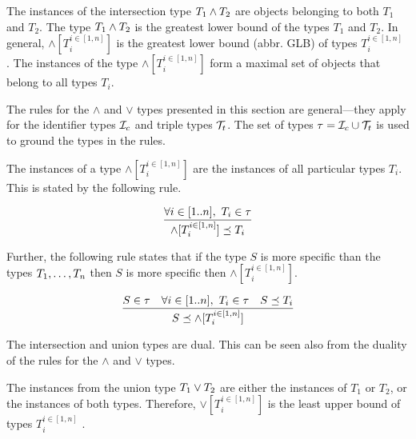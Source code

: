 \documentclass[runningheads]{llncs}
\newcommand{\I}{{\cal I}}
\newcommand{\T}{{\cal T}}
\newcommand{\memo}[1]{}
\begin{document}
The instances of the intersection type $T_1\land\/T_2$ are objects
belonging to both $T_1$ and $T_2$. The type $T_1\land\/T_2$ is the
greatest lower bound of the types $T_1$ and $T_2$. In general,
$\land[T_i^{i\in[1,n]}]$ is the greatest lower bound (abbr. GLB) of
types $T_i^{i\in[1,n]}$ \cite{Pierce1991,Pierce1996}. The instances of
the type $\land[T_i^{i\in[1,n]}]$ form a maximal set of objects that
belong to all types $T_i$.

The rules for the $\land$ and $\lor$ types presented in this section
are general---they apply for the identifier types $\I_c$ and triple
types $\T_t$. The set of types $\tau=\I_c\cup\T_t$ is used to ground
the types in the rules.

The instances of a type $\land[T_i^{i\in[1,n]}]$ are the instances of all
particular types $T_i$. This is stated by the following rule. 

\memo{\begin{equation}
\dfrac{T_1,T_2\in\tau}
      {T_1\land\/T_2\preceq\/T_1}
\end{equation}

\begin{equation}
\dfrac{T_1,T_2\in\tau}
      {T_1\land\/T_2\preceq\/T_2}
\end{equation}}

\begin{equation}
\dfrac{\forall\/i\in[1..n],\ T_i\in\tau}
      {\land[T_i^{i\in[1,n]}] \preceq\/T_i} 
\end{equation}

Further, the following rule states that if the type $S$ is more
specific than the types $T_1,\ldots\/,T_n$ then $S$ is more specific
then $\land[T_i^{i\in[1,n]}]$.

\memo{\begin{equation}
\dfrac{S,T_1,T_2\in\tau\quad S\preceq\/T_1\quad\/S\preceq\/\/T_2}
      {S\preceq\/T_1\land\/T_2}  
\end{equation}}

\begin{equation}
\label{rul:intsc-gather}
\dfrac{S\in\tau\quad\forall\/i\in[1..n],\ T_i\in\tau\quad\/S\preceq\/T_i}
      {S\preceq\land[T_i^{i\in[1,n]}]}  
\end{equation} 

The intersection and union types are dual. This can be seen also from
the duality of the rules for the $\land$ and $\lor$ types.

The instances from the union type $T_1\lor\/T_2$ are either the
instances of $T_1$ or $T_2$, or the instances of both
types. Therefore, $\lor[T_i^{i\in[1,n]}]$ is the least upper bound of
types $T_i^{i\in[1,n]}$ \cite{Pierce1991}.
\end{document}
